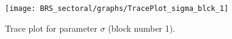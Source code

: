 \begin{figure}[H]
\centering
  \texttt{[image: BRS\_sectoral/graphs/TracePlot\_sigma\_blck\_1]}\\
    \caption{Trace plot for parameter ${\sigma}$ (block number 1).}
\end{figure}
